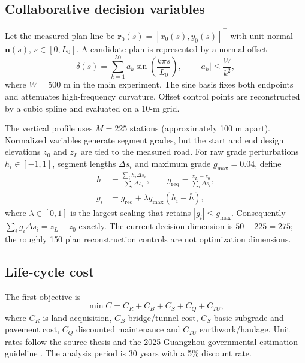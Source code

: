 \documentclass[preprint,12pt]{elsarticle}
\begin{document}
\subsection{Collaborative decision variables}

Let the measured plan line be $\bm r_0(s)=[x_0(s),y_0(s)]^\top$ with unit normal $\bm n(s)$, $s\in[0,L_0]$. A candidate plan is represented by a normal offset
\begin{equation}
\delta(s)=\sum_{k=1}^{50}a_k\sin\left(\frac{k\pi s}{L_0}\right), \qquad
|a_k|\leq \frac{W}{k^2},
\label{eq:sine}
\end{equation}
where $W=500$ m in the main experiment. The sine basis fixes both endpoints and attenuates high-frequency curvature. Offset control points are reconstructed by a cubic spline and evaluated on a 10-m grid.

The vertical profile uses $M=225$ stations (approximately 100 m apart). Normalized variables generate segment grades, but the start and end design elevations $z_0$ and $z_L$ are tied to the measured road. For raw grade perturbations $h_i\in[-1,1]$, segment lengths $\Delta s_i$ and maximum grade $g_{\max}=0.04$, define
\begin{align}
\bar h&=\frac{\sum_i h_i\Delta s_i}{\sum_i\Delta s_i},\qquad
g_{\mathrm{req}}=\frac{z_L-z_0}{\sum_i\Delta s_i},\\
g_i&=g_{\mathrm{req}}+\lambda g_{\max}(h_i-\bar h),
\label{eq:grades}
\end{align}
where $\lambda\in[0,1]$ is the largest scaling that retains $|g_i|\leq g_{\max}$. Consequently $\sum_i g_i\Delta s_i=z_L-z_0$ exactly. The current decision dimension is $50+225=275$; the roughly 150 plan reconstruction controls are not optimization dimensions.

\subsection{Life-cycle cost}

The first objective is
\begin{equation}
\min C=C_R+C_B+C_S+C_Q+C_{TU},
\label{eq:lcc}
\end{equation}
where $C_R$ is land acquisition, $C_B$ bridge/tunnel cost, $C_S$ basic subgrade and pavement cost, $C_Q$ discounted maintenance and $C_{TU}$ earthwork/haulage. Unit rates follow the source thesis and the 2025 Guangzhou governmental estimation guideline \cite{guangzhou2025}. The analysis period is 30 years with a 5\% discount rate.
\end{document}
